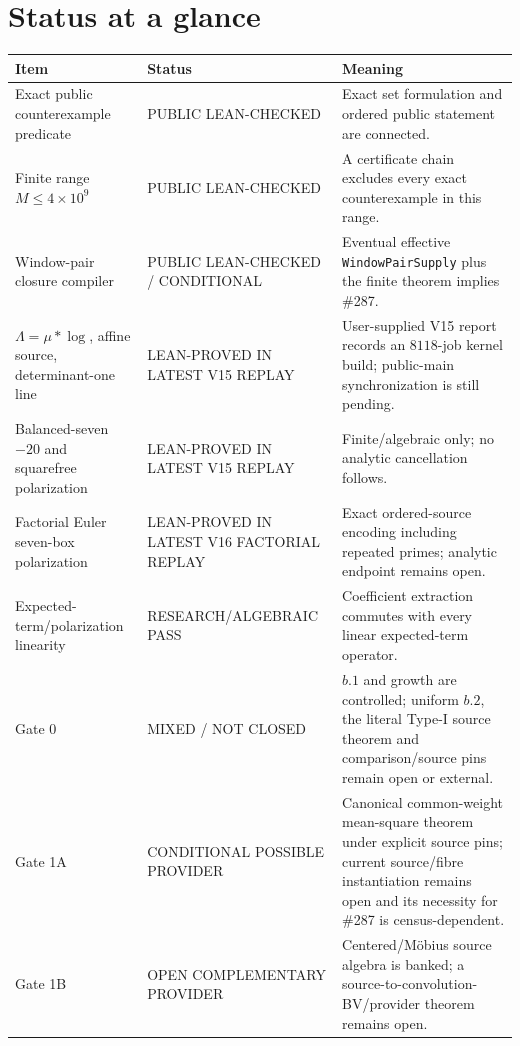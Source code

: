 \documentclass[11pt]{article}
\theoremstyle{definition}
\newcommand{\1}{\mathbf 1}
\newcommand{\status}[1]{\textsf{#1}}
\begin{document}
\section*{Status at a glance}
\begin{center}
\footnotesize
\renewcommand{\arraystretch}{1.18}
\begin{tabularx}{\textwidth}{>{\raggedright\arraybackslash}p{}
>{\raggedright\arraybackslash}p{}X}
\toprule
Item & Status & Meaning \\
\midrule
Exact public counterexample predicate & \status{PUBLIC LEAN-CHECKED} & Exact set formulation and ordered public statement are connected. \\
Finite range $M\le4\times10^9$ & \status{PUBLIC LEAN-CHECKED} & A certificate chain excludes every exact counterexample in this range. \\
Window-pair closure compiler & \status{PUBLIC LEAN-CHECKED / CONDITIONAL} & Eventual effective \texttt{WindowPairSupply} plus the finite theorem implies \#287. \\
$\Lambda=\mu*\log$, affine source, determinant-one line & \status{LEAN-PROVED IN LATEST V15 REPLAY} & User-supplied V15 report records an $8118$-job kernel build; public-main synchronization is still pending. \\
Balanced-seven $-20$ and squarefree polarization & \status{LEAN-PROVED IN LATEST V15 REPLAY} & Finite/algebraic only; no analytic cancellation follows. \\
Factorial Euler seven-box polarization & \status{LEAN-PROVED IN LATEST V16 FACTORIAL REPLAY} & Exact ordered-source encoding including repeated primes; analytic endpoint remains open. \\
Expected-term/polarization linearity & \status{RESEARCH/ALGEBRAIC PASS} & Coefficient extraction commutes with every linear expected-term operator. \\
Gate 0 & \status{MIXED / NOT CLOSED} & $b.1$ and growth are controlled; uniform $b.2$, the literal Type-I source theorem and comparison/source pins remain open or external. \\
Gate 1A & \status{CONDITIONAL POSSIBLE PROVIDER} & Canonical common-weight mean-square theorem under explicit source pins; current source/fibre instantiation remains open and its necessity for \#287 is census-dependent. \\
Gate 1B & \status{OPEN COMPLEMENTARY PROVIDER} & Centered/M\"obius source algebra is banked; a source-to-convolution-BV/provider theorem remains open. \\

\end{tabularx}
\end{center}
\end{document}
